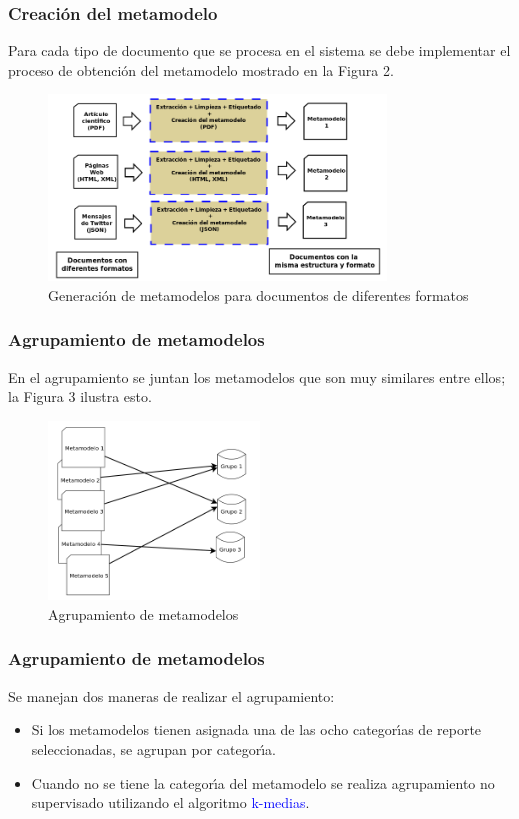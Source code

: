 \documentclass{beamer}
\begin{document}
\begin{frame}
  \frametitle{Creaci\'{o}n del metamodelo}
  Para cada tipo de documento que se procesa en el sistema se debe implementar el proceso de obtenci\'{o}n del metamodelo mostrado en la Figura 2.
  \begin{figure}
    \centering
    \includegraphics[width = 0.8\textwidth]{imagenes/procesoMetamodelo.png}
    \caption{Generaci\'{o}n de metamodelos para documentos de diferentes formatos}
    \label{obtencionMetamodelo}
  \end{figure}
\end{frame}


\begin{frame}
  \frametitle{Agrupamiento de metamodelos}
  En el agrupamiento se juntan los metamodelos que son muy similares entre ellos; la Figura 3 ilustra esto.

  \begin{figure}
    \centering
    \includegraphics[width = 0.5\textwidth]{imagenes/agrupamiento.png}
    \caption{Agrupamiento de metamodelos}
    \label{agrupamientoMetamodelos}
  \end{figure}
\end{frame}

\begin{frame}
\frametitle{Agrupamiento de metamodelos}
  Se manejan dos maneras de realizar el agrupamiento:\\
  \begin{itemize}
  \item Si los metamodelos tienen asignada una de las ocho categor\'{\i}as de reporte seleccionadas, se agrupan por categor\'{\i}a.
  \vspace{2 mm}
  \item Cuando no se tiene la categor\'{\i}a del metamodelo se realiza agrupamiento no supervisado utilizando el algoritmo \textcolor{blue}{k-medias}.
  \end{itemize}
\end{frame}
\end{document}
